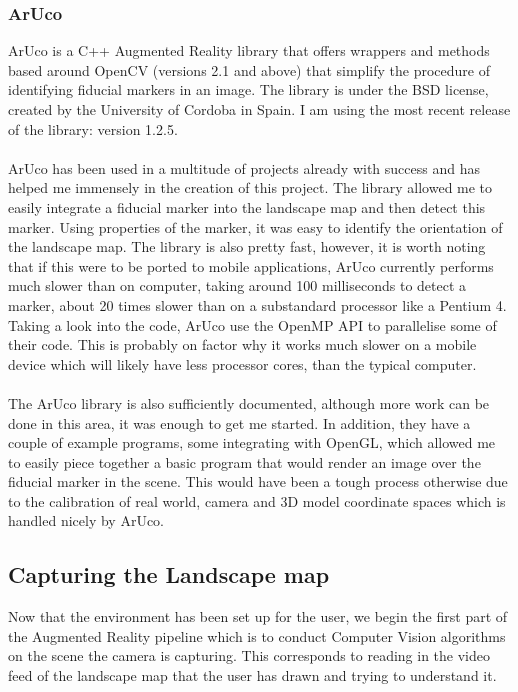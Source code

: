 \documentclass[11pt]{article}
\begin{document}
\subsubsection{ArUco}
ArUco is a C++ Augmented Reality library that offers wrappers and methods
based around OpenCV (versions 2.1 and above) that simplify the procedure
of identifying fiducial markers in an image. The library is under the BSD
license, created by the University of Cordoba in Spain. I am using the
most recent release of the library: version 1.2.5.\\
\\
ArUco has been used in a multitude of projects already with success and 
has helped me immensely in the creation of this project. The library 
allowed me to easily integrate a fiducial marker into the landscape map
and then detect this marker. Using properties of the marker, it was easy
to identify the orientation of the landscape map. The library is also 
pretty fast, however, it is worth noting that if this were to be ported
to mobile applications, ArUco currently performs much slower than on
computer, taking around 100 milliseconds to detect a marker, 
about 20 times slower than on a substandard processor like a Pentium 4.
Taking a look into the code, ArUco use the OpenMP API to parallelise
some of their code. This is probably on factor why it works much
slower on a mobile device which will likely have less processor cores, than
the typical computer.\\
\\
The ArUco library is also sufficiently documented, although more work can
be done in this area, it was enough to get me started. In addition, they
have a couple of example programs, some integrating with OpenGL, which 
allowed me to easily piece together a basic program that would render
an image over the fiducial marker in the scene. This would have been
a tough process otherwise due to the calibration of real world, camera and
3D model coordinate spaces which is handled nicely by ArUco.

\subsection{Capturing the Landscape map}
Now that the environment has been set up for the user, we begin the first
part of the Augmented Reality pipeline which is to conduct Computer
Vision algorithms on the scene the camera is capturing. This corresponds to
reading in the video feed of the landscape map that the user has drawn and
trying to understand it.
\end{document}

